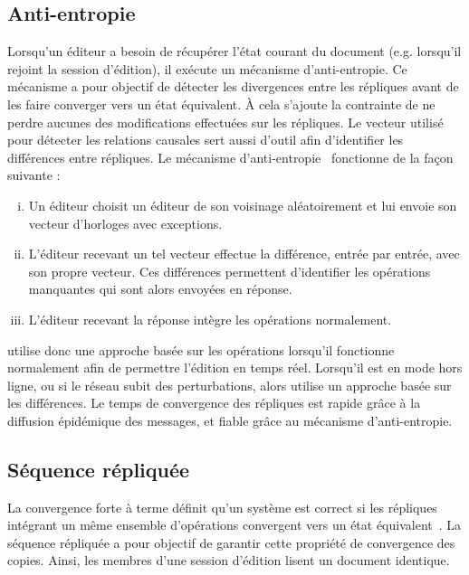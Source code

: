 \subsection{Anti-entropie}

Lorsqu'un éditeur a besoin de récupérer l'état courant du document
(e.g. lorsqu'il rejoint la session d'édition), il exécute un mécanisme
d'anti-entropie.  Ce mécanisme a pour objectif de détecter les divergences entre
les répliques avant de les faire converger vers un état équivalent. À cela
s'ajoute la contrainte de ne perdre aucunes des modifications effectuées sur les
répliques. Le vecteur utilisé pour détecter les relations causales sert aussi
d'outil afin d'identifier les différences entre répliques. Le mécanisme
d'anti-entropie~\cite{demers1987epidemic, vanderlinde2016delta} fonctionne de la
façon suivante :
\begin{enumerate}[(i)]
\item Un éditeur choisit un éditeur de son voisinage aléatoirement et lui envoie
  son vecteur d'horloges avec exceptions.
\item L'éditeur recevant un tel vecteur effectue la différence, entrée par
  entrée, avec son propre vecteur. Ces différences permettent d'identifier les
  opérations manquantes qui sont alors envoyées en réponse.
\item L'éditeur recevant la réponse intègre les opérations normalement.
\end{enumerate}

\CRATE utilise donc une approche basée sur les opérations lorsqu'il fonctionne
normalement afin de permettre l'édition en temps réel. Lorsqu'il est en mode
hors ligne, ou si le réseau subit des perturbations, alors \CRATE utilise un
approche basée sur les différences. Le temps de convergence des répliques est
rapide grâce à la diffusion épidémique des messages, et fiable grâce au
mécanisme d'anti-entropie.


\subsection{Séquence répliquée}

La convergence forte à terme définit qu'un système est correct si les répliques
intégrant un même ensemble d'opérations convergent vers un état
équivalent~\cite{shapiro2011conflict}. La séquence répliquée a pour objectif de
garantir cette propriété de convergence des copies. Ainsi, les membres d'une
session d'édition lisent un document identique.

